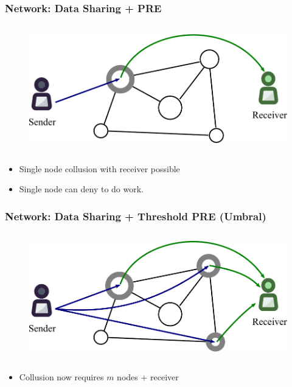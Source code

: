 \documentclass[xetex,mathsans,sans,aspectratio=169]{beamer}
\begin{document}
    \begin{frame}
        \frametitle{Network: Data Sharing + PRE}
        \begin{figure}
            \centering
            \includegraphics[height=5.5cm]{pdf/prenodes.pdf}
        \end{figure}
        \begin{itemize}
            \item Single node collusion with receiver possible
            \item Single node can deny to do work.
        \end{itemize}
    \end{frame}

    \begin{frame}
        \frametitle{Network: Data Sharing + Threshold PRE (Umbral)}
        \begin{figure}
            \centering
            \includegraphics[height=5.5cm]{pdf/umbralnodes.pdf}
        \end{figure}
        \begin{itemize}
            \item Collusion now requires $m$ nodes + receiver
        \end{itemize}
    \end{frame}
\end{document}
